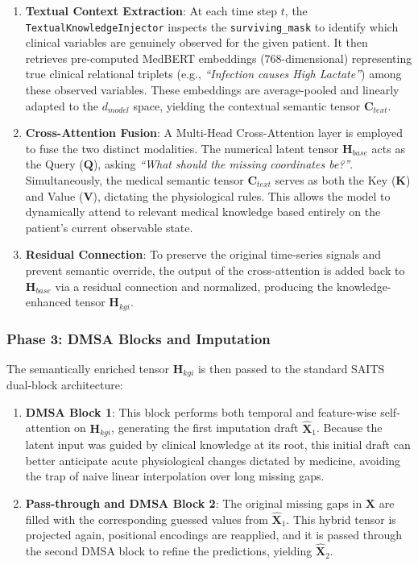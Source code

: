 \begin{enumerate}
    \item \textbf{Textual Context Extraction}: At each time step $t$, the \texttt{TextualKnowledgeInjector} inspects the \texttt{surviving\_mask} to identify which clinical variables are genuinely observed for the given patient. It then retrieves pre-computed MedBERT embeddings (768-dimensional) representing true clinical relational triplets (e.g., \textit{``Infection causes High Lactate''}) among these observed variables. These embeddings are average-pooled and linearly adapted to the $d_{model}$ space, yielding the contextual semantic tensor $\mathbf{C}_{text}$.
    
    \item \textbf{Cross-Attention Fusion}: A Multi-Head Cross-Attention layer is employed to fuse the two distinct modalities. The numerical latent tensor $\mathbf{H}_{base}$ acts as the Query ($\mathbf{Q}$), asking \textit{``What should the missing coordinates be?''}. Simultaneously, the medical semantic tensor $\mathbf{C}_{text}$ serves as both the Key ($\mathbf{K}$) and Value ($\mathbf{V}$), dictating the physiological rules. This allows the model to dynamically attend to relevant medical knowledge based entirely on the patient's current observable state.
    
    \item \textbf{Residual Connection}: To preserve the original time-series signals and prevent semantic override, the output of the cross-attention is added back to $\mathbf{H}_{base}$ via a residual connection and normalized, producing the knowledge-enhanced tensor $\mathbf{H}_{kgi}$.
\end{enumerate}

\subsubsection{Phase 3: DMSA Blocks and Imputation}
The semantically enriched tensor $\mathbf{H}_{kgi}$ is then passed to the standard SAITS dual-block architecture:

\begin{enumerate}
    \item \textbf{DMSA Block 1}: This block performs both temporal and feature-wise self-attention on $\mathbf{H}_{kgi}$, generating the first imputation draft $\mathbf{\hat{X}}_1$. Because the latent input was guided by clinical knowledge at its root, this initial draft can better anticipate acute physiological changes dictated by medicine, avoiding the trap of naive linear interpolation over long missing gaps.
    
    \item \textbf{Pass-through and DMSA Block 2}: The original missing gaps in $\mathbf{X}$ are filled with the corresponding guessed values from $\mathbf{\hat{X}}_1$. This hybrid tensor is projected again, positional encodings are reapplied, and it is passed through the second DMSA block to refine the predictions, yielding $\mathbf{\hat{X}}_2$.
\end{enumerate}

